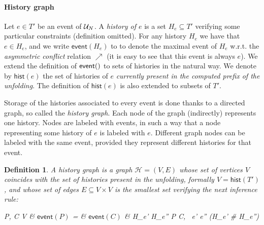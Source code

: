 \documentclass{article}
\newtheorem{definition}{Definition}
\newcommand{\event}[1]{\ensuremath{\mathsf{event}(#1)}}
\newcommand{\hist}[1]{\ensuremath{\mathsf{hist}(#1)}}
\newcommand{\h}{\ensuremath{\mathcal{H}}}
\begin{document}
\paragraph{History graph} Let $e \in T'$ be an event of $\mathcal{U}_{N}$.  A
\emph{history of $e$} is a set $H_e \subseteq T'$ verifying some particular
constraints (definition omitted).  For any history $H_e$ we have that $e \in
H_e$, and we write $\event{H_e}$ to to denote the maximal event of $H_e$ w.r.t.
the \emph{asymmetric conflict} relation $\nearrow$ (it is easy to see that this
event is always $e$).  We extend the definition of $\event$ to sets of
histories in the natural way.  We denote by $\hist{e}$ the set of histories of
$e$ \emph{currently present in the computed prefix of the unfolding}.  The
definition of $\hist{e}$ is also extended to subsets of $T'$.

Storage of the histories associated to every event is done thanks to a directed
graph, so called the \emph{history graph}.  Each node of the graph (indirectly)
represents one history.  Nodes are labeled with events, in such a way that a
node representing some history of $e$ is labeled with $e$.  Different graph
nodes can be labeled with the same event, provided they represent different
histories for that event.

\begin{definition}

A \emph{history graph} is a graph $\h = (V, E)$ whose set of vertices $V$
coincides with the set of histories present in the unfolding, formally $V =
\hist{T'}$, and whose set of edges $E \subseteq V \times V$ is the smallest set
verifying the next inference rule:

\begin{center}
	{P, C \subseteq V &
	\event{P} =  \cup {} &
	\event{C} \subseteq {} &
	\forall H_{e'} H_{e''} \in P \cup C, \ e' \neq e'' \land \neg (H_{e'} \# H_{e''})
	}
\end{center}

\end{definition}

\end{document}
